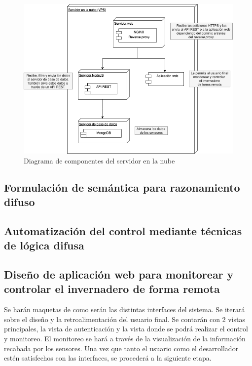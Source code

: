 \begin{figure}[!ht]
	\centering
	\includegraphics[width=.95\linewidth]{imagenes/diagramas/componentes_vps.png}
	\caption{Diagrama de componentes del servidor en la nube}
	\label{fig:componentes_vps}
\end{figure}



\subsection{Formulación de semántica para razonamiento difuso}
\subsection{Automatización del control mediante técnicas de lógica difusa}



\subsection{Diseño de aplicación web para monitorear y controlar el invernadero de forma remota}
Se harán maquetas de como serán las distintas interfaces del sistema. Se iterará sobre el diseño y la retroalimentación del usuario final. Se contarán con 2 vistas principales, la vista de autenticación y la vista donde se podrá realizar el control y monitoreo. El monitoreo se hará a través de la visualización de la información recabada por los sensores. Una vez que tanto el usuario como el desarrollador estén satisfechos con las interfaces, se procederá a la siguiente etapa.

